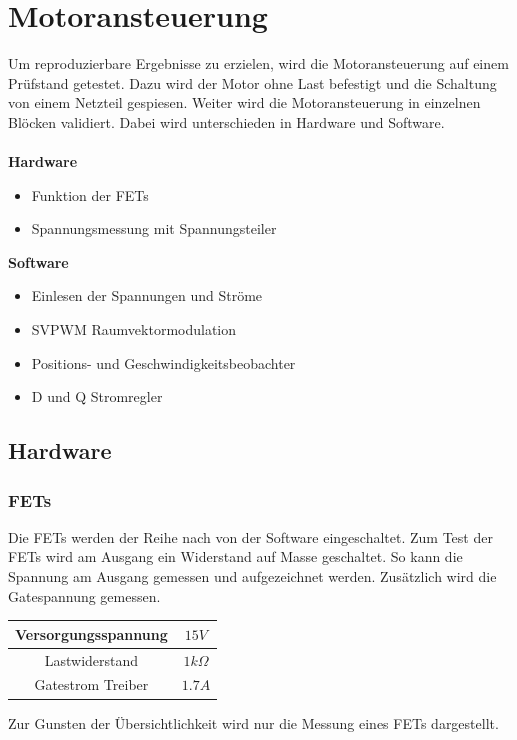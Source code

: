 \section{Motoransteuerung} \label{ValidMotoransteuerung}
Um reproduzierbare Ergebnisse zu erzielen, wird die Motoransteuerung auf einem Prüfstand getestet. Dazu wird der Motor ohne Last befestigt und die Schaltung von einem Netzteil gespiesen. Weiter wird die Motoransteuerung in einzelnen Blöcken validiert. Dabei wird unterschieden in Hardware und Software.\\
\\
\textbf{Hardware}
\begin{itemize}
	\item Funktion der FETs
	\item Spannungsmessung mit Spannungsteiler
\end{itemize}
\textbf{Software}
\begin{itemize}
	\item Einlesen der Spannungen und Ströme
	\item SVPWM Raumvektormodulation
	\item Positions- und Geschwindigkeitsbeobachter
	\item D und Q Stromregler
\end{itemize}

\subsection*{Hardware}
\subsubsection*{FETs}
Die FETs werden der Reihe nach von der Software eingeschaltet. Zum Test der FETs wird am Ausgang ein Widerstand auf Masse geschaltet. So kann die Spannung am Ausgang gemessen und aufgezeichnet werden. Zusätzlich wird die Gatespannung gemessen.

\begin{center}
	\begin{tabular}{|c|c|}
		\hline 
		Versorgungsspannung & $15V$ \\ \hline
		Lastwiderstand & $1k\Omega$ \\ \hline
		Gatestrom Treiber & $1.7A$ \\ \hline
	\end{tabular} 
	\label{tab:fetmessbed}
\end{center}

Zur Gunsten der Übersichtlichkeit wird nur die Messung eines FETs dargestellt.

